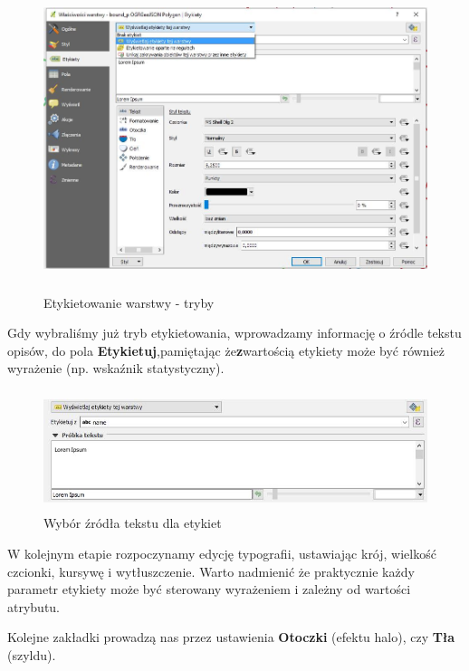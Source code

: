 \documentclass[12pt,a4paper]{book}
\begin{document}
\begin{center}
\begin{figure}
\includegraphics[width=13cm,height=8.862cm]{007-etykiety-tryb.jpg}
\caption{Etykietowanie warstwy - tryby}
\end{figure}
\end{center}
Gdy wybraliśmy już tryb etykietowania, wprowadzamy informację o źródle tekstu opisów, do pola \textbf{Etykietuj},pamiętając że\textbf{z}wartością etykiety może być również wyrażenie (np. wskaźnik statystyczny).



\begin{center}
\begin{figure}
\includegraphics[width=13cm,height=3.517cm]{007-etykiety-zrodlo.jpg}
\caption{Wybór źródła tekstu dla etykiet}
\end{figure}
\end{center}
W kolejnym etapie rozpoczynamy edycję typografii, ustawiając krój, wielkość czcionki, kursywę i wytłuszczenie. Warto nadmienić że praktycznie każdy parametr etykiety może być sterowany wyrażeniem i zależny od wartości atrybutu.

Kolejne zakładki prowadzą nas przez ustawienia \textbf{Otoczki }(efektu halo), czy \textbf{Tła }(szyldu).
\end{document}
